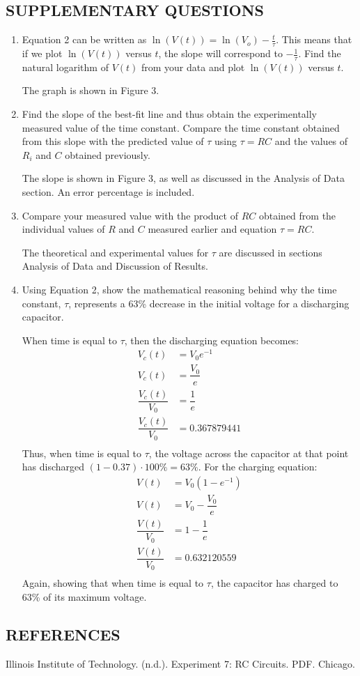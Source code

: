 \documentclass [12pt, letterpaper, twoside] {article}
\begin{document}
\subsection* {SUPPLEMENTARY QUESTIONS}
\begin{enumerate}
  \item{Equation 2 can be written as \(\ln(V(t)) = \ln(V_{o})-\frac{t}{\tau}\). This means that if we plot \(\ln(V(t))\) versus \(t\), the slope will correspond to \(-\frac{1}{\tau}\). Find the natural logarithm of \(V(t)\) from your data and plot \(\ln(V(t))\) versus \(t\).}

  The graph is shown in Figure 3.
  \item{Find the slope of the best-fit line and thus obtain the experimentally measured value of the time constant. Compare the time constant obtained from this slope with the predicted value of \(\tau\) using \(\tau=RC\) and the values of \(R_{i}\) and \(C\) obtained previously.}

  The slope is shown in Figure 3, as well as discussed in the Analysis of Data section. An error percentage is included.
  \item{Compare your measured value with the product of \(RC\) obtained from the individual values of \(R\) and \(C\) measured earlier and equation \(\tau=RC\).}
  
  The theoretical and experimental values for \(\tau\) are discussed in sections Analysis of Data and Discussion of Results.  
  \item{Using Equation 2, show the mathematical reasoning behind why the time constant, \(\tau\), represents a 63\% decrease in the initial voltage for a discharging capacitor.}

  When time is equal to \(\tau\), then the discharging equation becomes:
  \begin{equation*}
    \begin{split}
      V_{c}(t) &= V_{0}e^{-1} \\
      V_{c}(t) &= \dfrac{V_{0}}{e} \\
      \dfrac{V_{c}(t)}{V_{0}} &= \dfrac{1}{e} \\
      \dfrac{V_{c}(t)}{V_{0}} &= 0.367879441 \\
    \end{split}
  \end{equation*}
  Thus, when time is equal to \(\tau\), the voltage across the capacitor at that point has discharged \((1-0.37)\cdot{100\%} = 63\%\).
  For the charging equation:
  \begin{equation*}
    \begin{split}
      V(t) &= V_{0}\left(1-e^{-1}\right) \\
      V(t) &= V_{0}-\dfrac{V_{0}}{e} \\
      \dfrac{V(t)}{V_{0}} &= 1-\dfrac{1}{e} \\
      \dfrac{V(t)}{V_{0}} &= 0.632120559 \\
    \end{split}
  \end{equation*}
  Again, showing that when time is equal to \(\tau\), the capacitor has charged to 63\% of its maximum voltage.
\end{enumerate}

\subsection* {REFERENCES}
Illinois Institute of Technology. (n.d.). Experiment 7: RC Circuits. PDF. Chicago.
\end{document}
